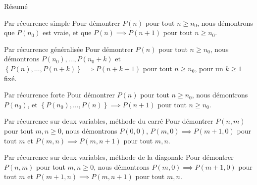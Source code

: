 \documentclass[a4paper]{article}
\begin{document}
\begin{parag}{Résumé}
    \begin{subparag}{Par récurrence simple}
        Pour démontrer $P\left(n\right)$ pour tout $n \geq n_0$, nous démontrons que $P\left(n_0\right)$ est vraie, et que $P\left(n\right) \implies P\left(n+1\right)$ pour tout $n \geq n_0$.
    \end{subparag}

    \begin{subparag}{Par récurrence généralisée}
        Pour démontrer $P\left(n\right)$ pour tout $n \geq n_0$, nous démontrons $P\left(n_0\right), \ldots, P\left(n_0 + k\right)$ et $\left\{P\left(n\right), \ldots, P\left(n+k\right)\right\} \implies P\left(n + k + 1\right)$ pour tout $n \geq n_0$, pour un $k \geq 1$ fixé.
    \end{subparag}
    
    \begin{subparag}{Par récurrence forte}
        Pour démontrer $P\left(n\right)$ pour tout $n \geq n_0$, nous démontrons $P\left(n_0\right)$, et $\left\{P\left(n_0\right), \ldots, P\left(n\right)\right\} \implies P\left(n+1\right)$ pour tout $n \geq n_0$.
    \end{subparag}

    \begin{subparag}{Par récurrence sur deux variables, méthode du carré}
        Pour démontrer $P\left(n, m\right)$ pour tout $m, n \geq 0$, nous démontrons $P\left(0, 0\right)$, $P\left(m, 0\right) \implies P\left(m + 1, 0\right)$ pour tout $m$ et $P\left(m, n\right) \implies P\left(m, n + 1\right)$ pour tout $m, n$.
    \end{subparag}

    \begin{subparag}{Par récurrence sur deux variables, méthode de la diagonale}
        Pour démontrer $P\left(n, m\right)$ pour tout $m, n \geq 0$, nous démontrons $P\left(m, 0\right) \implies P\left(m + 1, 0\right)$ pour tout $m$ et $P\left(m+1, n\right) \implies P\left(m, n+1\right)$ pour tout $m, n$.
    \end{subparag}
\end{parag}
\end{document}
